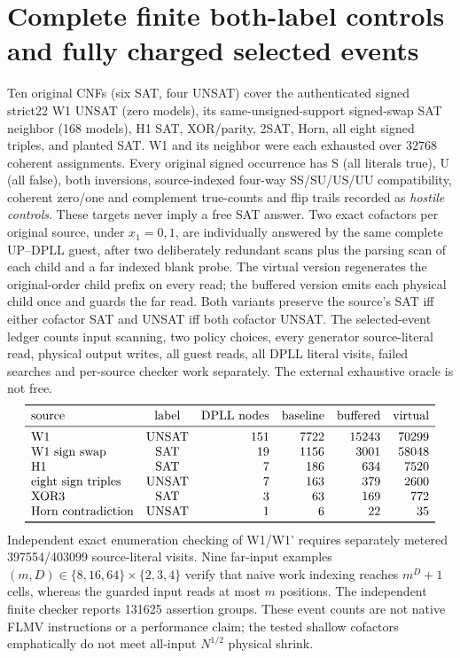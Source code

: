 \documentclass[10pt]{article}
\begin{document}
\section{Complete finite both-label controls and fully charged selected events}
Ten original CNFs (six SAT, four UNSAT) cover the authenticated signed strict22 W1 UNSAT (zero models), its same-unsigned-support signed-swap SAT neighbor (168 models), H1 SAT, XOR/parity, 2SAT, Horn, all eight signed triples, and planted SAT. W1 and its neighbor were each exhausted over $32768$ coherent assignments. Every original signed occurrence has S (all literals true), U (all false), both inversions, source-indexed four-way SS/SU/US/UU compatibility, coherent zero/one and complement true-counts and flip trails recorded as \emph{hostile controls}. These targets never imply a free SAT answer.
Two exact cofactors per original source, under $x_1=0,1$, are individually answered by the same complete UP--DPLL guest, after two deliberately redundant scans plus the parsing scan of each child and a far indexed blank probe. The virtual version regenerates the original-order child prefix on every read; the buffered version emits each physical child once and guards the far read. Both variants preserve the source's SAT iff either cofactor SAT and UNSAT iff both cofactor UNSAT. The selected-event ledger counts input scanning, two policy choices, every generator source-literal read, physical output writes, all guest reads, all DPLL literal visits, failed searches and per-source checker work separately. The external exhaustive oracle is not free.
\[
\begin{array}{lcrrrr}\toprule
\text{source}&\text{label}&\text{DPLL nodes}&\text{baseline}&\text{buffered}&\text{virtual}\\\midrule
\text{W1}&\text{UNSAT}&151&7722&15243&70299\\
\text{W1 sign swap}&\text{SAT}&19&1156&3001&58048\\
\text{H1}&\text{SAT}&7&186&634&7520\\
\text{eight sign triples}&\text{UNSAT}&7&163&379&2600\\
\text{XOR3}&\text{SAT}&3&63&169&772\\
\text{Horn contradiction}&\text{UNSAT}&1&6&22&35\\\bottomrule
\end{array}
\]
Independent exact enumeration checking of W1/W1' requires separately metered 397554/403099 source-literal visits. Nine far-input examples $(m,D)\in\{8,16,64\}\times\{2,3,4\}$ verify that naive work indexing reaches $m^D+1$ cells, whereas the guarded input reads at most $m$ positions. The independent finite checker reports 131625 assertion groups. These event counts are not native FLMV instructions or a performance claim; the tested shallow cofactors emphatically do not meet all-input $N^{1/2}$ physical shrink.
\end{document}
